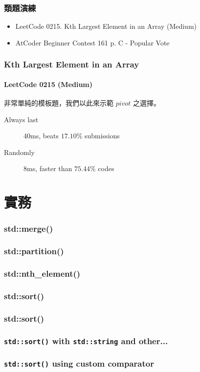 \documentclass{beamer}
\begin{document}
\frame
{
	\frametitle{類題演練}
	
	\begin{itemize}
		\item LeetCode 0215. Kth Largest Element in an Array (Medium)
		\item AtCoder Beginner Contest 161 p. C - Popular Vote
	\end{itemize}
}

\frame
{
	\frametitle{Kth Largest Element in an Array}
	\framesubtitle{LeetCode 0215 (Medium)}
	
	非常單純的模板題，我們以此來示範 $pivot$ 之選擇。
	
	\begin{description}
		\item[Always last] 40ms, beats $17.10\%$ submissions
		\item[Randomly] 8ms, faster than $75.44\%$ codes
	\end{description}
}

\section{實務}

\frame
{
	\frametitle{\ttfamily std::merge()}
	
	
}

\frame
{
	\frametitle{\ttfamily std::partition()}
	
	\small
	
}

\frame
{
	\frametitle{\ttfamily std::nth\_element()}
	
	
}

\subsubsection{std::sort()}

\frame
{
	\frametitle{\ttfamily std::sort()}
	
	
}

\frame
{
	\frametitle{\texttt{std::sort()} with \texttt{std::string} and other...}
	
	
}

\frame
{
	\frametitle{\texttt{std::sort()} using custom comparator}
	
	
}
\end{document}
